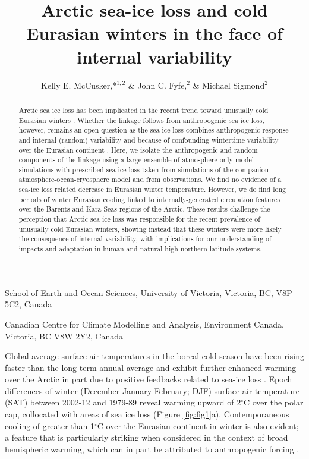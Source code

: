 \documentclass{nature}
\title{Arctic sea-ice loss and cold Eurasian winters in the face of internal variability}%
\author{Kelly E. McCusker,*$^{1,2}$ \& John C. Fyfe,$^{2}$ \& Michael Sigmond$^2$}
\begin{document}
\maketitle

\begin{affiliations}
 \item School of Earth and Ocean Sciences, University of Victoria, Victoria, BC, V8P 5C2, Canada
 \item Canadian Centre for Climate Modelling and Analysis, Environment Canada, Victoria, BC V8W 2Y2, Canada
\end{affiliations}


\begin{abstract}
Arctic sea ice loss has been implicated in the recent trend toward unusually cold Eurasian winters \cite{liu12,mori14,kim14}. Whether the linkage follows from anthropogenic sea ice loss, however, remains an open question as the sea-ice loss combines anthropogenic response and internal (random) variability \cite{swart15,wettstein14} and because of confounding wintertime variability over the Eurasian continent \cite{deser12b,screen14a}. Here, we isolate the anthropogenic and random components of the linkage using a large ensemble of atmosphere-only model simulations with prescribed sea ice loss taken from simulations of the companion atmosphere-ocean-cryosphere model and from observations. We find no evidence of a sea-ice loss related decrease in Eurasian winter temperature. However, we do find long periods of winter Eurasian cooling linked to internally-generated circulation features over the Barents and Kara Seas regions of the Arctic. These results challenge the perception that Arctic sea ice loss was responsible for the recent prevalence of unusually cold Eurasian winters, showing instead that these winters were more likely the consequence of internal variability, with implications for our understanding of impacts and adaptation in human and natural high-northern latitude systems. 
\end{abstract}

Global average surface air temperatures in the boreal cold season have been rising faster than the long-term annual average \cite{wallace12} and exhibit further enhanced warming over the Arctic in part due to positive feedbacks related to sea-ice loss \cite{screen10,cohen14}. Epoch differences of winter (December-January-February; DJF) surface air temperature (SAT) between 2002-12 and 1979-89 reveal warming upward of 2$^\circ$C over the polar cap, collocated with areas of sea ice loss (Figure \ref{fig:fig1}a). Contemporaneous cooling of greater than 1$^\circ$C over the Eurasian continent in winter is also evident; a feature that is particularly striking when considered in the context of broad hemispheric warming, which can in part be attributed to anthropogenic forcing \cite{gillett08,qian15}. 
\end{document}
